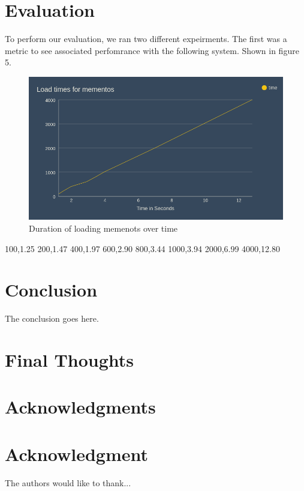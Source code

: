 \documentclass[10pt,journal,compsoc]{IEEEtran}
\begin{document}
\section{Evaluation}

To perform our evaluation, we ran two different expeirments. The first was a metric to see associated perfomrance with the following system. Shown in figure 5.

\begin{figure}[b]
\centering
\includegraphics[scale=0.2]{Figure5}
\caption{Duration of loading memenots over time}
\label{fig:mesh4}
\end{figure}

100,1.25
200,1.47
400,1.97
600,2.90
800,3.44
1000,3.94
2000,6.99
4000,12.80


\section{Conclusion}
The conclusion goes here.

\section{Final Thoughts}



\ifCLASSOPTIONcompsoc
  \section*{Acknowledgments}
\else
  \section*{Acknowledgment}
\fi


The authors would like to thank...
\end{document}

